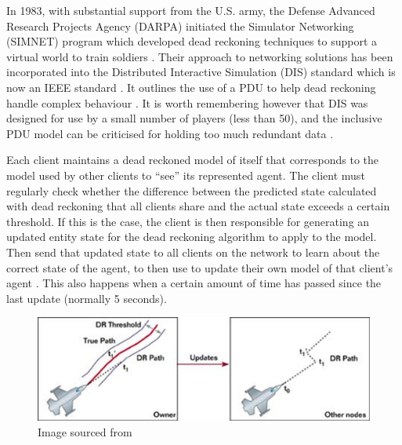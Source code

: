 \documentclass[journal]{IEEEtran}
\begin{document}

In 1983, with substantial support from the U.S. army, the Defense Advanced Research Projects Agency (DARPA) initiated the Simulator Networking (SIMNET) program which developed dead reckoning techniques to support a virtual world to train soldiers \cite{calvin1993simnet}. Their approach to networking solutions has been incorporated into the Distributed Interactive Simulation (DIS) standard which is now an IEEE standard \cite{dis1998ieee}. It outlines the use of a PDU to help dead reckoning handle complex behaviour \cite{mccarty1994virtual}. It is worth remembering however that DIS was designed for use by a small number of players (less than 50), and the inclusive PDU model can be criticised for holding too much redundant data \cite{henderson2001latency}.
 
Each client maintains a dead reckoned model of itself that corresponds to the model used by other clients to ``see'' its represented agent. The client must regularly check whether the difference between the predicted state calculated with dead reckoning that all clients share and the actual state exceeds a certain threshold. If this is the case, the client is then responsible for generating an updated entity state for the dead reckoning algorithm to apply to the model. Then send that updated state to all clients on the network to learn about the correct state of the agent, to then use to update their own model of that client's agent \cite{calvin1993simnet} \cite{mauve2000keep}. This also happens when a certain amount of time has passed since the last update \cite{mills1992network} (normally 5 seconds).

\begin{figure}[h]
    \centering
    \includegraphics[width=0.9\linewidth]{Threshold1.png}
    \caption{Image sourced from \cite{aronson1997gamasutra}}
    \label{fig:threshold}
\end{figure}
\end{document}
